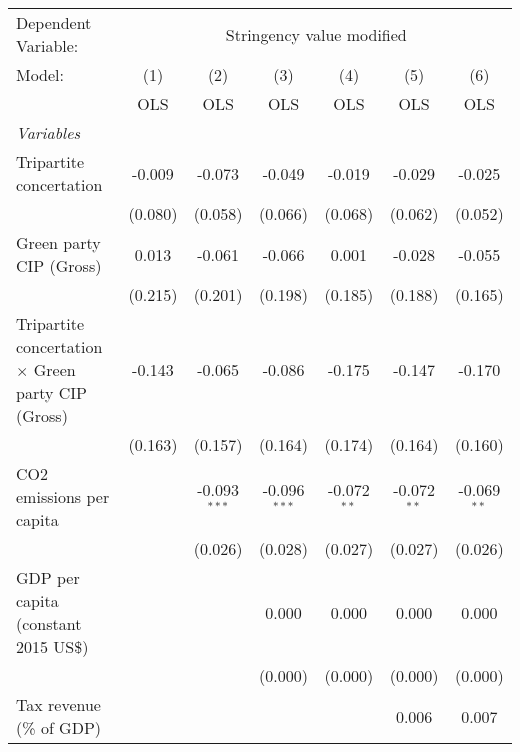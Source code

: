 
\begingroup
\centering
\begin{tabular}{lcccccc}
   \toprule
   Dependent Variable: & \multicolumn{6}{c}{Stringency value modified}\\
   Model:                                                    & (1)     & (2)            & (3)            & (4)           & (5)           & (6)\\  
                                                             &  OLS    & OLS            & OLS            & OLS           & OLS           & OLS\\  
   \midrule
   \emph{Variables}\\
   Tripartite concertation                                   & -0.009  & -0.073         & -0.049         & -0.019        & -0.029        & -0.025\\   
                                                             & (0.080) & (0.058)        & (0.066)        & (0.068)       & (0.062)       & (0.052)\\   
   Green party CIP (Gross)                                   & 0.013   & -0.061         & -0.066         & 0.001         & -0.028        & -0.055\\   
                                                             & (0.215) & (0.201)        & (0.198)        & (0.185)       & (0.188)       & (0.165)\\   
   Tripartite concertation $\times$ Green party CIP (Gross)  & -0.143  & -0.065         & -0.086         & -0.175        & -0.147        & -0.170\\   
                                                             & (0.163) & (0.157)        & (0.164)        & (0.174)       & (0.164)       & (0.160)\\   
   CO2 emissions per capita                                  &         & -0.093$^{***}$ & -0.096$^{***}$ & -0.072$^{**}$ & -0.072$^{**}$ & -0.069$^{**}$\\   
                                                             &         & (0.026)        & (0.028)        & (0.027)       & (0.027)       & (0.026)\\   
   GDP per capita (constant 2015 US\$)                       &         &                & 0.000          & 0.000         & 0.000         & 0.000\\   
                                                             &         &                & (0.000)        & (0.000)       & (0.000)       & (0.000)\\   
   Tax revenue (\% of GDP)                                   &         &                &                &               & 0.006         & 0.007\\   

\end{tabular}
